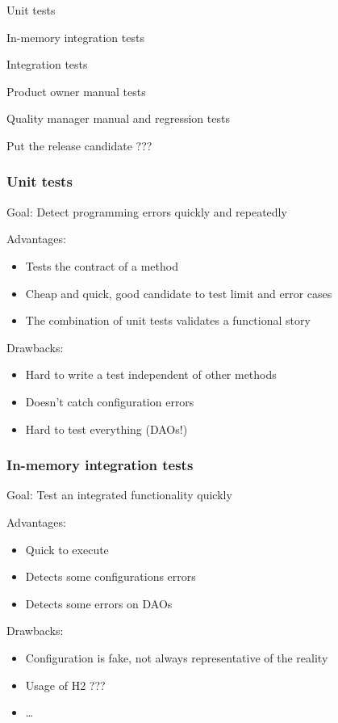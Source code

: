 \documentclass[a4paper, 11pt]{article}
\begin{document}
    Unit tests

    In-memory integration tests

    Integration tests

    Product owner manual tests

    Quality manager manual and regression tests

    Put the release candidate ???

    \subsubsection{Unit tests}

    Goal: Detect programming errors quickly and repeatedly

    Advantages:

    \begin{itemize}
        \item Tests the contract of a method
        \item Cheap and quick, good candidate to test limit and error cases
        \item The combination of unit tests validates a functional story
    \end{itemize}

    Drawbacks:
    \begin{itemize}
        \item Hard to write a test independent of other methods
        \item Doesn't catch configuration errors
        \item Hard to test everything (DAOs!)
    \end{itemize}

    \subsubsection{In-memory integration tests}

    Goal: Test an integrated functionality quickly

    Advantages:
    \begin{itemize}
        \item Quick to execute
        \item Detects some configurations errors
        \item Detects some errors on DAOs
    \end{itemize}

    Drawbacks:
    \begin{itemize}
        \item Configuration is fake, not always representative of the reality
        \item Usage of H2 ???
        \item \ldots
    \end{itemize}
\end{document}
